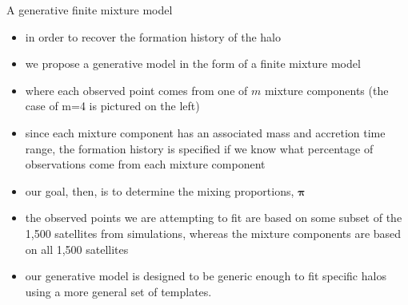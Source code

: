 \documentclass{beamer}
\newcommand{\vect}[1]{\boldsymbol{\mathbf{#1}}}
\newcommand{\vp}{\vect{\pi}}
\begin{document}
\begin{frame}[shrink]{A generative finite mixture model}
	
	\begin{itemize}
		
		
		\item in order to recover the formation history of the halo
		\item we propose a generative model in the form of a finite mixture model
		\item where each observed point comes from one of $m$ mixture components (the case of m=4 is pictured on the left)
		\item since each mixture component has an associated mass and accretion time range, the formation history is specified if we know what percentage of observations come from each mixture component
		
		\item our goal, then, is to determine the mixing proportions, $\vp$
		
		\item the observed points we are attempting to fit are based on some subset of the 1,500 satellites from simulations, whereas the mixture components are based on all 1,500 satellites
		\item our generative model is designed to be generic enough to fit specific halos using a more general set of templates.
	\end{itemize}
	
\end{frame}
\end{document}
